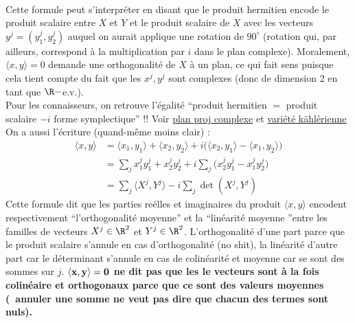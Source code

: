 \\
Cette formule peut s’interpréter en disant que le produit hermitien encode le produit scalaire entre $X$ et $Y$ et le produit scalaire de $X$ avec les vecteurs $y^j=(y^j_1, y^j_2)$  auquel on aurait applique une rotation de $90^\circ$ (rotation qui, par ailleurs, correspond à la multiplication par $i$ dans le plan complexe). Moralement, $\langle x,y \rangle =0$ demande une orthogonalité de $X$ à un plan, ce qui fait sens puisque cela tient compte du fait que les $x^j, y^j$ sont complexes (donc de dimension 2 en tant que $\R-$e.v.).
\\
Pour les connaisseurs, on retrouve l'égalité ``produit hermitien $=$ produit scalaire $-i$ forme symplectique'' !!
Voir
\href{https://fr.wikipedia.org/wiki/Espace_projectif#Espace_projectif_complexe}{plan proj complexe} et \href{https://fr.wikipedia.org/wiki/Vari%C3%A9t%C3%A9_k%C3%A4hl%C3%A9rienne}{variété kählérienne }
\\

On a aussi l'écriture (quand-même moins clair) :
\begin{align*}
\langle x,y \rangle &= \langle x_1, y_1\rangle + \langle x_2, y_2\rangle 
+ i\big(\langle x_2, y_1\rangle - \langle x_1,y_2\rangle\big) \\
&= \sum_j x^j_1 y^j_1+ x^j_2 y^j_2+ i\sum_j \big( x^j_2 y^j_1 - x^j_1y^j_2 \big) \\
&= \sum_j \big\langle X^j,Y^j\big\rangle - i\sum_j \det(X^j, Y^j)
\end{align*}
Cette formule dit que les parties reélles et imaginaires du produit $\langle x,y \rangle$ encodent respectivement ``l'orthogonalité moyenne'' et la ``linéarité moyenne ''entre les familles de vecteurs $X^j\in\R^2$ et $Y^j\in\R^2$. L'orthogonalité d'une part parce que le produit scalaire s'annule en cas d'orthogonalité (no shit), la linéarité d'autre part car le déterminant s'annule en cas de colinéarité et moyenne car se sont des sommes sur $j$. \textbf{$\bf{\langle x,y \rangle=0}$ ne dit pas que les le vecteurs sont à la fois colinéaire et orthogonaux parce que ce sont des valeurs moyennes (\ie~annuler une somme ne veut pas dire que chacun des termes sont nuls).}
\\

